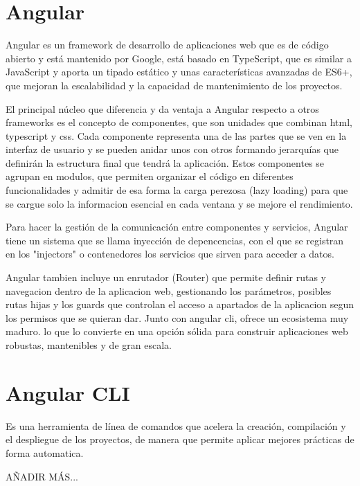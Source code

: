 
\section{Angular}\label{angular}
Angular es un framework de desarrollo de aplicaciones web que es de código abierto y está mantenido por Google, está basado en TypeScript, que es similar a JavaScript y aporta un tipado estático y unas características avanzadas de ES6+, que mejoran la escalabilidad y la capacidad de mantenimiento de los proyectos. 

El principal núcleo que diferencia y da ventaja a Angular respecto a otros frameworks es el concepto de componentes, que son unidades que combinan html, typescript y css. Cada componente representa una de las partes que se ven en la interfaz de usuario y se pueden anidar unos con otros formando jerarquías que definirán la estructura final que tendrá la aplicación. Estos componentes se agrupan en modulos, que permiten organizar el código en diferentes funcionalidades y admitir de esa forma la carga perezosa (lazy loading) para que se cargue solo la informacion esencial en cada ventana y se mejore el rendimiento.

Para hacer la gestión de la comunicación entre componentes y servicios, Angular tiene un sistema que se llama inyección de depencencias, con el que se registran en los "injectors" o contenedores los servicios que sirven para acceder a datos.

Angular tambien incluye un enrutador (Router) que permite definir rutas y navegacion dentro de la aplicacion web, gestionando los parámetros, posibles rutas hijas y los guards que controlan el acceso a apartados de la aplicacion segun los permisos que se quieran dar. Junto con angular cli, ofrece un ecosistema muy maduro. lo que lo convierte en una opción sólida para construir aplicaciones web robustas, mantenibles y de gran escala.

\section{Angular CLI}\label{angular-cli}
Es una herramienta de línea de comandos que acelera la creación, compilación y el despliegue de los proyectos, de manera que permite aplicar mejores prácticas de forma automatica.

AÑADIR MÁS...